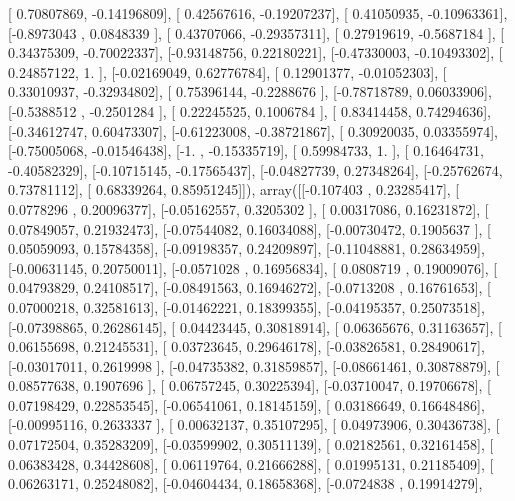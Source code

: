 \documentclass{article}
\begin{document}
       [ 0.70807869, -0.14196809],
       [ 0.42567616, -0.19207237],
       [ 0.41050935, -0.10963361],
       [-0.8973043 ,  0.0848339 ],
       [ 0.43707066, -0.29357311],
       [ 0.27919619, -0.5687184 ],
       [ 0.34375309, -0.70022337],
       [-0.93148756,  0.22180221],
       [-0.47330003, -0.10493302],
       [ 0.24857122,  1.        ],
       [-0.02169049,  0.62776784],
       [ 0.12901377, -0.01052303],
       [ 0.33010937, -0.32934802],
       [ 0.75396144, -0.2288676 ],
       [-0.78718789,  0.06033906],
       [-0.5388512 , -0.2501284 ],
       [ 0.22245525,  0.1006784 ],
       [ 0.83414458,  0.74294636],
       [-0.34612747,  0.60473307],
       [-0.61223008, -0.38721867],
       [ 0.30920035,  0.03355974],
       [-0.75005068, -0.01546438],
       [-1.        , -0.15335719],
       [ 0.59984733,  1.        ],
       [ 0.16464731, -0.40582329],
       [-0.10715145, -0.17565437],
       [-0.04827739,  0.27348264],
       [-0.25762674,  0.73781112],
       [ 0.68339264,  0.85951245]]), array([[-0.107403  ,  0.23285417],
       [ 0.0778296 ,  0.20096377],
       [-0.05162557,  0.3205302 ],
       [ 0.00317086,  0.16231872],
       [ 0.07849057,  0.21932473],
       [-0.07544082,  0.16034088],
       [-0.00730472,  0.1905637 ],
       [ 0.05059093,  0.15784358],
       [-0.09198357,  0.24209897],
       [-0.11048881,  0.28634959],
       [-0.00631145,  0.20750011],
       [-0.0571028 ,  0.16956834],
       [ 0.0808719 ,  0.19009076],
       [ 0.04793829,  0.24108517],
       [-0.08491563,  0.16946272],
       [-0.0713208 ,  0.16761653],
       [ 0.07000218,  0.32581613],
       [-0.01462221,  0.18399355],
       [-0.04195357,  0.25073518],
       [-0.07398865,  0.26286145],
       [ 0.04423445,  0.30818914],
       [ 0.06365676,  0.31163657],
       [ 0.06155698,  0.21245531],
       [ 0.03723645,  0.29646178],
       [-0.03826581,  0.28490617],
       [-0.03017011,  0.2619998 ],
       [-0.04735382,  0.31859857],
       [-0.08661461,  0.30878879],
       [ 0.08577638,  0.1907696 ],
       [ 0.06757245,  0.30225394],
       [-0.03710047,  0.19706678],
       [ 0.07198429,  0.22853545],
       [-0.06541061,  0.18145159],
       [ 0.03186649,  0.16648486],
       [-0.00995116,  0.2633337 ],
       [ 0.00632137,  0.35107295],
       [ 0.04973906,  0.30436738],
       [ 0.07172504,  0.35283209],
       [-0.03599902,  0.30511139],
       [ 0.02182561,  0.32161458],
       [ 0.06383428,  0.34428608],
       [ 0.06119764,  0.21666288],
       [ 0.01995131,  0.21185409],
       [ 0.06263171,  0.25248082],
       [-0.04604434,  0.18658368],
       [-0.0724838 ,  0.19914279],
\end{document}
